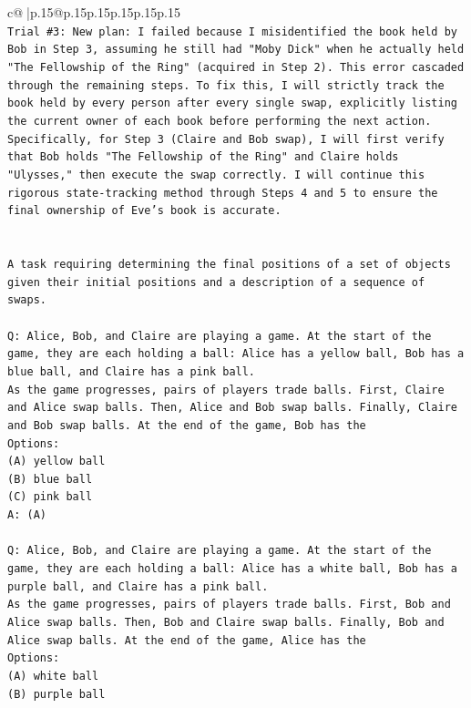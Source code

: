 \documentclass{article}
\begin{document}
{\begin{supertabular}{c@{$\;$}|p{.15\linewidth}@{}p{.15\linewidth}p{.15\linewidth}p{.15\linewidth}p{.15\linewidth}p{.15\linewidth}}
{{{\\ 
\texttt{Trial \#3: New plan: I failed because I misidentified the book held by Bob in Step 3, assuming he still had "Moby Dick" when he actually held "The Fellowship of the Ring" (acquired in Step 2). This error cascaded through the remaining steps. To fix this, I will strictly track the book held by every person after every single swap, explicitly listing the current owner of each book before performing the next action. Specifically, for Step 3 (Claire and Bob swap), I will first verify that Bob holds "The Fellowship of the Ring" and Claire holds "Ulysses," then execute the swap correctly. I will continue this rigorous state{-}tracking method through Steps 4 and 5 to ensure the final ownership of Eve's book is accurate.} \\
\\ 
\\ 
\texttt{A task requiring determining the final positions of a set of objects given their initial positions and a description of a sequence of swaps.} \\
\\ 
\texttt{Q: Alice, Bob, and Claire are playing a game. At the start of the game, they are each holding a ball: Alice has a yellow ball, Bob has a blue ball, and Claire has a pink ball.} \\
\texttt{As the game progresses, pairs of players trade balls. First, Claire and Alice swap balls. Then, Alice and Bob swap balls. Finally, Claire and Bob swap balls. At the end of the game, Bob has the} \\
\texttt{Options:} \\
\texttt{(A) yellow ball} \\
\texttt{(B) blue ball} \\
\texttt{(C) pink ball} \\
\texttt{A: (A)} \\
\\ 
\texttt{Q: Alice, Bob, and Claire are playing a game. At the start of the game, they are each holding a ball: Alice has a white ball, Bob has a purple ball, and Claire has a pink ball.} \\
\texttt{As the game progresses, pairs of players trade balls. First, Bob and Alice swap balls. Then, Bob and Claire swap balls. Finally, Bob and Alice swap balls. At the end of the game, Alice has the} \\
\texttt{Options:} \\
\texttt{(A) white ball} \\
\texttt{(B) purple ball} \\
}}}
\end{supertabular}}
\end{document}
